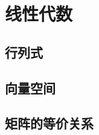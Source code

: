 \part{线性代数}
\begingroup
\def\x{\mat{X}}
\def\y{\mat{Y}}
\def\a{\mat{\alpha}}
\def\b{\mat{\beta}}
\def\e{\mat{\varepsilon}}
\def\g{\mat{\gamma}}
\def\X#1{\x_{#1}}
\def\A{\mat{A}}
\def\B{\mat{B}}
\def\C{\mat{C}}
\def\D{\mat{D}}
\def\P{\mat{P}}
\def\Q{\mat{Q}}
\def\l{\lambda}
\def\L#1{\l_{#1}}
\def\z{\mat{0}}
\def\E{\mat{E}}
\def\V{\mat{\Lambda}}










\chapter{行列式}







\chapter{向量空间}









\chapter{矩阵的等价关系}




\endgroup
